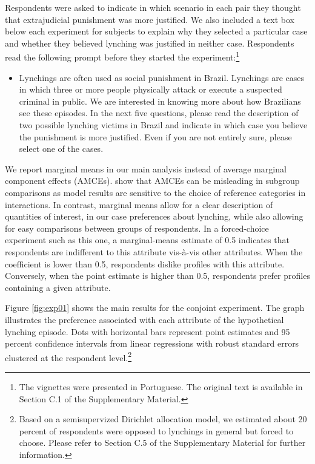 \documentclass[12pt,a4paper]{article}
\providecommand{\tightlist}{%
   \setlength{\itemsep}{0pt}\setlength{\parskip}{0pt}}
\begin{document}
Respondents were asked to indicate in which scenario in each pair they thought
that extrajudicial punishment was more justified. We also included a text box
below each experiment for subjects to explain why they selected a particular
case and whether they believed lynching was justified in neither case.
Respondents read the following prompt before they started the
experiment:\footnote{The vignettes were presented in Portuguese. The original
text is available in Section C.1 of the Supplementary Material.}

\begin{itemize} \tightlist \item Lynchings are often used as social punishment
  in Brazil. Lynchings are cases in which three or more people physically
  attack or execute a suspected criminal in public. We are interested in
  knowing more about how Brazilians see these episodes. In the next five
  questions, please read the description of two possible lynching victims in
  Brazil and indicate in which case you believe the punishment is more
  justified. Even if you are not entirely sure, please select one of the cases.
\end{itemize}

We report marginal means in our main analysis instead of average marginal
component effects (AMCEs). \citet{leeper2020measuring} show that AMCEs can be
misleading in subgroup comparisons as model results are sensitive to the choice
of reference categories in interactions. In contrast, marginal means allow for
a clear description of quantities of interest, in our case preferences about
lynching, while also allowing for easy comparisons between groups of
respondents. In a forced-choice experiment such as this one, a marginal-means
estimate of 0.5 indicates that respondents are indifferent to this attribute
vis-à-vis other attributes. When the coefficient is lower than 0.5, respondents
dislike profiles with this attribute. Conversely, when the point estimate is
higher than 0.5, respondents prefer profiles containing a given attribute.

Figure \ref{fig:exp01} shows the main results for the conjoint experiment. The
graph illustrates the preference associated with each attribute of the
hypothetical lynching episode. Dots with horizontal bars represent point
estimates and 95 percent confidence intervals from linear regressions with
robust standard errors clustered at the respondent level.\footnote{Based on a
semisupervized Dirichlet allocation model, we estimated about 20 percent of
respondents were opposed to lynchings in general but forced to choose. Please
refer to Section C.5 of the Supplementary Material for further information.}
\end{document}
